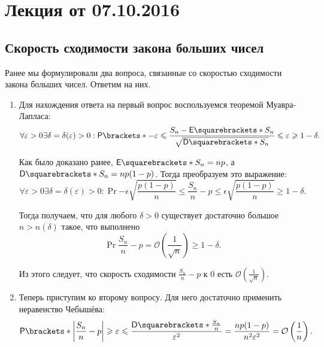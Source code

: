 \section{Лекция от 07.10.2016}

\subsection{Скорость сходимости закона больших чисел}
Ранее мы формулировали два вопроса, связанные со скоростью сходимости закона больших чисел. Ответим на них.

\begin{enumerate}
    \item Для нахождения ответа на первый вопрос воспользуемся теоремой Муавра-Лапласа:
    \[\forall \varepsilon > 0 \exists \delta = \delta(\varepsilon) > 0 : \Pr{-\varepsilon \leq \frac{S_n - \E{S_n}}{\sqrt{\D{S_n}}} \leq \varepsilon} \geq 1 - \delta.\]
    
    Как было доказано ранее, \(\E{S_n} = np\), а \(\D{S_n} = np(1 - p)\). Тогда преобразуем это выражение:
    \[\forall \varepsilon > 0 \exists \delta = \delta(\varepsilon) > 0 : \Pr{-\epsilon\sqrt{\frac{p(1 - p)}{n}} \leq \frac{S_n}{n} - p \leq \epsilon\sqrt{\frac{p(1 - p)}{n}}} \geq 1 - \delta.\]
    
    Тогда получаем, что для любого \(\delta > 0\) существует достаточно большое \(n > n(\delta)\) такое, что выполнено
    \[\Pr{\frac{S_n}{n} - p = \mathcal{O}\left(\frac{1}{\sqrt{n}}\right)} \geq 1 - \delta.\]
    
    Из этого следует, что скорость сходимости \(\frac{S_n}{n} - p\) к 0 есть \(\mathcal{O}\left(\frac{1}{\sqrt{n}}\right)\).
    
    \item Теперь приступим ко второму вопросу. Для него достаточно применить неравенство Чебышёва:
    \[\Pr{\left|\frac{S_n}{n}-p\right| \geq \epsilon} \leq \frac{\D{\frac{S_n}{n}}}{\epsilon^2} =
    \frac{np(1 - p)}{n^2\epsilon^2} = \mathcal{O}\left(\frac{1}{n}\right).\]
\end{enumerate}


